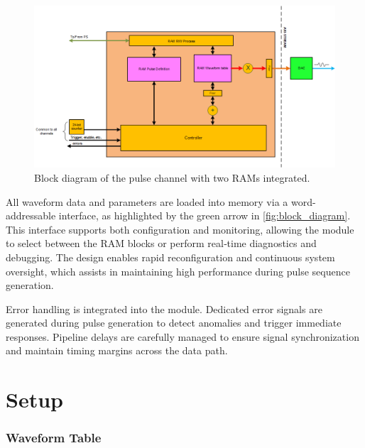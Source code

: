 \begin{figure}[ht]
    \centering
    \includegraphics[width=1.0\linewidth]{figures/3.1.png}
    \caption{Block diagram of the pulse channel with two RAMs integrated.}
    \label{fig:block_diagram}
\end{figure}

All waveform data and parameters are loaded into memory via a word-addressable interface, as highlighted by the green arrow in \autoref{fig:block_diagram}. This interface supports both configuration and monitoring, allowing the module to select between the RAM blocks or perform real‐time diagnostics and debugging. The design enables rapid reconfiguration and continuous system oversight, which assists in maintaining high performance during pulse sequence generation.

Error handling is integrated into the module. Dedicated error signals are generated during pulse generation to detect anomalies and trigger immediate responses. Pipeline delays are carefully managed to ensure signal synchronization and maintain timing margins across the data path.

\section{Setup}
\subsubsection{Waveform Table}

